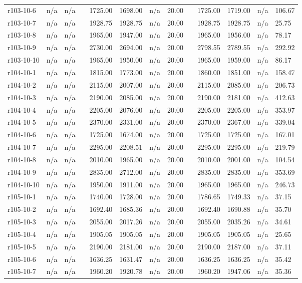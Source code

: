 \documentclass[final,5p,times,twocolumn]{elsarticle}
\begin{document}
{{{{{{{{{{{{{\begin{longtable}{l l l l l l l l l l l l l}
r103-10-6& n/a& n/a&&1725.00& 1698.00& n/a& 20.00&&1725.00& 1719.00& n/a& 106.67\\
r103-10-7& n/a& n/a&&1928.75& 1928.75& n/a& 20.00&&1928.75& 1928.75& n/a& 25.75\\
r103-10-8& n/a& n/a&&1965.00& 1947.00& n/a& 20.00&&1965.00& 1956.00& n/a& 78.17\\
r103-10-9& n/a& n/a&&2730.00& 2694.00& n/a& 20.00&&2798.55& 2789.55& n/a& 292.92\\
r103-10-10& n/a& n/a&&1965.00& 1950.00& n/a& 20.00&&1965.00& 1959.00& n/a& 86.17\\
r104-10-1& n/a& n/a&&1815.00& 1773.00& n/a& 20.00&&1860.00& 1851.00& n/a& 158.47\\
r104-10-2& n/a& n/a&&2115.00& 2007.00& n/a& 20.00&&2115.00& 2085.00& n/a& 206.73\\
r104-10-3& n/a& n/a&&2190.00& 2085.00& n/a& 20.00&&2190.00& 2181.00& n/a& 412.63\\
r104-10-4& n/a& n/a&&2205.00& 2076.00& n/a& 20.00&&2205.00& 2205.00& n/a& 353.97\\
r104-10-5& n/a& n/a&&2370.00& 2331.00& n/a& 20.00&&2370.00& 2367.00& n/a& 339.04\\
r104-10-6& n/a& n/a&&1725.00& 1674.00& n/a& 20.00&&1725.00& 1725.00& n/a& 167.01\\
r104-10-7& n/a& n/a&&2295.00& 2208.51& n/a& 20.00&&2295.00& 2295.00& n/a& 219.79\\
r104-10-8& n/a& n/a&&2010.00& 1965.00& n/a& 20.00&&2010.00& 2001.00& n/a& 104.54\\
r104-10-9& n/a& n/a&&2835.00& 2712.00& n/a& 20.00&&2835.00& 2835.00& n/a& 353.69\\
r104-10-10& n/a& n/a&&1950.00& 1911.00& n/a& 20.00&&1965.00& 1965.00& n/a& 246.73\\
r105-10-1& n/a& n/a&&1740.00& 1728.00& n/a& 20.00&&1786.65& 1749.33& n/a& 37.15\\
r105-10-2& n/a& n/a&&1692.40& 1685.36& n/a& 20.00&&1692.40& 1690.88& n/a& 35.70\\
r105-10-3& n/a& n/a&&2055.00& 2017.26& n/a& 20.00&&2055.00& 2035.26& n/a& 34.61\\
r105-10-4& n/a& n/a&&1905.05& 1905.05& n/a& 20.00&&1905.05& 1905.05& n/a& 25.65\\
r105-10-5& n/a& n/a&&2190.00& 2181.00& n/a& 20.00&&2190.00& 2187.00& n/a& 37.11\\
r105-10-6& n/a& n/a&&1636.25& 1631.47& n/a& 20.00&&1636.25& 1636.25& n/a& 35.42\\
r105-10-7& n/a& n/a&&1960.20& 1920.78& n/a& 20.00&&1960.20& 1947.06& n/a& 35.36\\

\end{longtable}}}}}}}}}}}}}}
\end{document}
